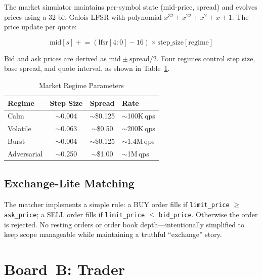 \documentclass[conference]{IEEEtran}
\begin{document}
The market simulator maintains per-symbol state (mid-price, spread) and evolves prices using a 32-bit Galois LFSR with polynomial $x^{32}+x^{22}+x^{2}+x+1$. The price update per quote:

\begin{equation}
\text{mid}[s] \mathrel{+}= (\text{lfsr}[4{:}0] - 16) \times \text{step\_size}[\text{regime}]
\end{equation}

Bid and ask prices are derived as $\text{mid} \pm \text{spread}/2$. Four regimes control step size, base spread, and quote interval, as shown in Table~\ref{tab:regimes}.

\begin{table}[h]
\centering
\caption{Market Regime Parameters}
\label{tab:regimes}
\begin{tabular}{@{}lccl@{}}
\toprule
\textbf{Regime} & \textbf{Step Size} & \textbf{Spread} & \textbf{Rate} \\
\midrule
Calm       & $\sim$0.004 & $\sim$\$0.125 & $\sim$100K\,qps \\
Volatile   & $\sim$0.063 & $\sim$\$0.50  & $\sim$200K\,qps \\
Burst      & $\sim$0.004 & $\sim$\$0.125 & $\sim$1.4M\,qps \\
Adversarial& $\sim$0.250 & $\sim$\$1.00  & $\sim$1M\,qps \\
\bottomrule
\end{tabular}
\end{table}

\subsection{Exchange-Lite Matching}

The matcher implements a simple rule: a BUY order fills if \texttt{limit\_price} $\geq$ \texttt{ask\_price}; a SELL order fills if \texttt{limit\_price} $\leq$ \texttt{bid\_price}. Otherwise the order is rejected. No resting orders or order book depth---intentionally simplified to keep scope manageable while maintaining a truthful ``exchange'' story.

\section{Board~B: Trader}
\end{document}
